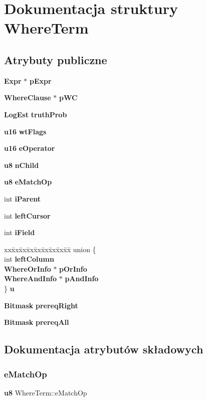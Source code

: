 \section{Dokumentacja struktury Where\+Term}
\label{struct_where_term}
\subsection*{Atrybuty publiczne}
\begin{DoxyCompactItemize}
\item 
\textbf{ Expr} $\ast$ \textbf{ p\+Expr}
\item 
\textbf{ Where\+Clause} $\ast$ \textbf{ p\+WC}
\item 
\textbf{ Log\+Est} \textbf{ truth\+Prob}
\item 
\textbf{ u16} \textbf{ wt\+Flags}
\item 
\textbf{ u16} \textbf{ e\+Operator}
\item 
\textbf{ u8} \textbf{ n\+Child}
\item 
\textbf{ u8} \textbf{ e\+Match\+Op}
\item 
int \textbf{ i\+Parent}
\item 
int \textbf{ left\+Cursor}
\item 
int \textbf{ i\+Field}
\item 
\begin{tabbing}
xx\=xx\=xx\=xx\=xx\=xx\=xx\=xx\=xx\=\kill
union \{\\
\>int \textbf{ leftColumn}\\
\>\textbf{ WhereOrInfo} $\ast$ \textbf{ pOrInfo}\\
\>\textbf{ WhereAndInfo} $\ast$ \textbf{ pAndInfo}\\
\} \textbf{ u}\\

\end{tabbing}\item 
\textbf{ Bitmask} \textbf{ prereq\+Right}
\item 
\textbf{ Bitmask} \textbf{ prereq\+All}
\end{DoxyCompactItemize}


\subsection{Dokumentacja atrybutów składowych}
\mbox{\label{struct_where_term_abe8cd628313f30428729ca6b6b05899b}} 
\subsubsection{eMatchOp}
{\footnotesize\ttfamily \textbf{ u8} Where\+Term\+::e\+Match\+Op}

